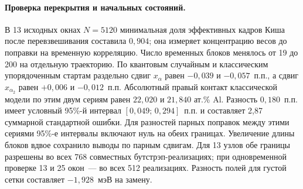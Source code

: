 \paragraph{Проверка перекрытия и начальных состояний.}
В 13 исходных окнах \(N=5120\) минимальная доля эффективных кадров
Киша после перевзвешивания составила \(0{,}904\); она измеряет
концентрацию весов до поправки на временную корреляцию. Число
временных блоков менялось от 19 до 200 на отдельную траекторию.
По квантовым случайным и классическим упорядоченным стартам раздельно
сдвиг \(x_\alpha\) равен \(-0{,}039\) и \(-0{,}057\)~п.п.,
а сдвиг \(x_{\alpha_2}\) равен \(+0{,}006\) и \(-0{,}012\)~п.п.
Абсолютный правый контакт классической модели по этим двум сериям
равен \(22{,}020\) и \(21{,}840\) ат.\% Al. Разность \(0{,}180\)~п.п.
имеет условный 95\%-й интервал \([0{,}049;\,0{,}294]\)~п.п. и составляет
2,87 суммарной стандартной ошибки. Для разностей парных поправок
между этими сериями 95\%-е интервалы включают нуль на обеих границах.
Увеличение длины блоков вдвое сохранило выводы по парным сдвигам.
Для 13 узлов обе границы разрешены во всех 768 совместных
бутстрэп-реализациях; при одновременной проверке 13 и 25 окон~---
во всех 512 реализациях. Разность полей для густой сетки составляет
\(-1{,}928\)~мэВ на замену.
